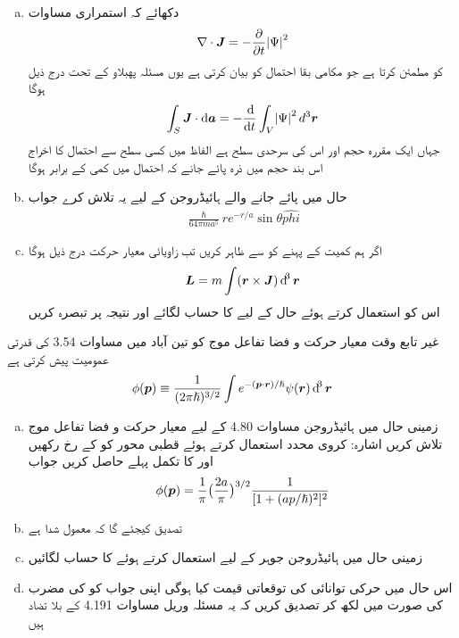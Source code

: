 \begin{enumerate}[a.]
\item
دکھائے کہ  استمراری مساوات 
\begin{align}
\nabla \cdot {\ensuremath{{\boldsymbol{J}}}} = - \frac{\partial}{\partial t} \abs{\Psi}^2
\end{align}
کو مطمئن کرتا ہے جو مکامی بقا احتمال کو بیان کرتی ہے یوں مسئلہ پهبلاو کے تحت درج ذیل ہوگا 
\begin{align}
\int_S \kvec{J} \cdot \dif \kvec{a} = - \frac{\dif}{\dif t} \int_V \abs{\Psi}^2 d^3 \kvec{r}
\end{align}
جہاں  ایک مقررہ حجم اور  اس کی سرحدی سطح ہے الفاظ میں کسی سطح سے احتمال کا اخراج اس بند حجم میں ذرہ پائے جانے کہ احتمال میں کمی کے برابر ہوگا 
\item
حال    میں پائے جانے والے ہائیڈروجن کے لیے یہ تلاش کرے جواب 
\begin{align*}
\frac{\hslash}{64 \pi m a^5} r e^{- r/a} \sin \theta \hat{phi}
\end{align*}
\item
اگر ہم کمیت کے پہنے کو  سے ظاہر کریں تب زاویائی معیار حرکت درج ذیل ہوگا 
\begin{align*}
\kvec{L} = m \int (\kvec{r} \times \kvec{J}) \dif^3 \kvec{r}
\end{align*}
اس کو استعمال کرتے ہوئے حال  کے لیے  کا حساب لگائے اور نتیجہ پر تبصرہ کریں 
\end{enumerate}
غیر تابع وقت معیار حرکت و فضا تفاعل موج کو تین آباد میں مساوات 3.54 کی قدرتی عمومیت پیش کرتی ہے 
\begin{align}
\phi (\kvec{p}) \equiv \frac{1}{(2 \pi \hslash)^{3/2}} \int e^{- (\kvec{p} \cdot \kvec{r})/\hslash} \psi (\kvec{r}) \dif^3 \kvec{r}
\end{align}
\begin{enumerate}[a.]
\item
زمینی حال میں ہائیڈروجن مساوات 4.80 کے لیے معیار حرکت و فضا تفاعل موج تلاش کریں اشارہ: کروی محدد استعمال کرتے ہوئے قطبی محور کو  کے رخ رکھیں اور  کا تکمل پہلے حاصل کریں جواب
\begin{align} 
\phi ({{\boldsymbol{p}}}) = \frac{1}{\pi} \big ( \frac{2a}{\pi} \big )^{3/2} \frac{1}{[1 + (a p/\hslash)^2]^2}
\end{align}
\item
تصدیق کیجئے گا کہ  معمول شدا ہے 
\item
زمینی حال میں ہائیڈروجن جوہر کے لیے  استعمال کرتے ہوئے  کا حساب لگائیں 
\item
اس حال میں حرکی توانائی کی توقعاتی قیمت کیا ہوگی اپنی جواب کو  کی مضرب کی صورت میں لکھ کر تصدیق کریں کہ یہ مسئلہ وريل مساوات 4.191 کے بلا تضاد ہیں 
\end{enumerate}
